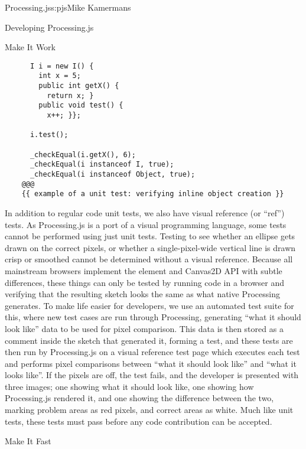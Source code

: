 \begin{aosachapter}{Processing.js}{s:pjs}{Mike Kamermans}
\begin{aosasect1}{Developing Processing.js}
\begin{aosasect2}{Make It Work}
\begin{verbatim}
      I i = new I() {
        int x = 5;
        public int getX() {
          return x; }
        public void test() {
          x++; }};

      i.test();

      _checkEqual(i.getX(), 6);
      _checkEqual(i instanceof I, true);
      _checkEqual(i instanceof Object, true);
    @@@
    {{ example of a unit test: verifying inline object creation }}
\end{verbatim}

In addition to regular code unit tests, we also have visual reference
(or ``ref'') tests. As Processing.js is a port of a visual programming
language, some tests cannot be performed using just unit
tests. Testing to see whether an ellipse gets drawn on the correct
pixels, or whether a single-pixel-wide vertical line is drawn crisp or
smoothed cannot be determined without a visual reference. Because all
mainstream browsers implement the
 element and Canvas2D API with
subtle differences, these things can only be tested by running code in
a browser and verifying that the resulting sketch looks the same as
what native Processing generates. To make life easier for developers,
we use an automated test suite for this, where new test cases are run
through Processing, generating ``what it should look like'' data to be
used for pixel comparison. This data is then stored as a comment
inside the sketch that generated it, forming a test, and these tests
are then run by Processing.js on a visual reference test page which
executes each test and performs pixel comparisons between ``what it
should look like'' and ``what it looks like''. If the pixels are off, the
test fails, and the developer is presented with three images; one
showing what it should look like, one showing how Processing.js
rendered it, and one showing the difference between the two, marking
problem areas as red pixels, and correct areas as white. Much like
unit tests, these tests must pass before any code contribution can be
accepted.

\end{aosasect2}

\begin{aosasect2}{Make It Fast}


\end{aosasect2}
\end{aosasect1}
\end{aosachapter}
